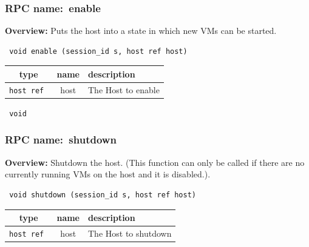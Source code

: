 \subsubsection{RPC name:~enable}

{\bf Overview:} 
Puts the host into a state in which new VMs can be started.

\begin{verbatim} void enable (session_id s, host ref host)\end{verbatim}



 
\vspace{0.3cm}
\begin{tabular}{|c|c|p{7cm}|}
 \hline
{\bf type} & {\bf name} & {\bf description} \\ \hline
{\tt host ref } & host & The Host to enable \\ \hline 

\end{tabular}

\vspace{0.3cm}

{\tt 
void
}



\vspace{0.3cm}
\vspace{0.3cm}
\vspace{0.3cm}
\subsubsection{RPC name:~shutdown}

{\bf Overview:} 
Shutdown the host. (This function can only be called if there are no
currently running VMs on the host and it is disabled.).

\begin{verbatim} void shutdown (session_id s, host ref host)\end{verbatim}



 
\vspace{0.3cm}
\begin{tabular}{|c|c|p{7cm}|}
 \hline
{\bf type} & {\bf name} & {\bf description} \\ \hline
{\tt host ref } & host & The Host to shutdown \\ \hline 

\end{tabular}

